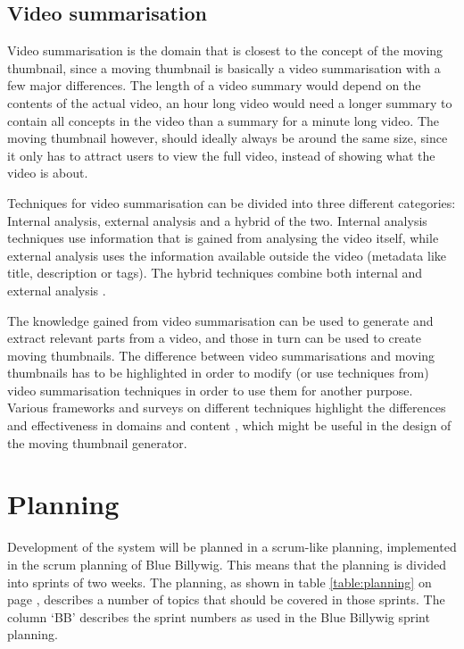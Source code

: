 \documentclass{../resources/acm_proc_article-sp}
\begin{document}
\subsection{Video summarisation}

Video summarisation is the domain that is closest to the concept of the moving thumbnail, since a moving thumbnail is basically a video summarisation with a few major differences. The length of a video summary would depend on the contents of the actual video, an hour long video would need a longer summary to contain all concepts in the video than a summary for a minute long video. The moving thumbnail however, should ideally always be around the same size, since it only has to attract users to view the full video, instead of showing what the video is about.

Techniques for video summarisation can be divided into three different categories: Internal analysis, external analysis and a hybrid of the two. Internal analysis techniques use information that is gained from analysing the video itself, while external analysis uses the information available outside the video (metadata like title, description or tags). The hybrid techniques combine both internal and external analysis \cite{Money:2008fn}.

The knowledge gained from video summarisation can be used to generate and extract relevant parts from a video, and those in turn can be used to create moving thumbnails. The difference between video summarisations and moving thumbnails has to be highlighted in order to modify (or use techniques from) video summarisation techniques in order to use them for another purpose. Various frameworks and surveys on different techniques highlight the differences and effectiveness in domains and content \cite{Money:2008fn,Ajmal:2012hi}, which might be useful in the design of the moving thumbnail generator.

\section{Planning}

Development of the system will be planned in a scrum-like planning, implemented in the scrum planning of Blue Billywig. This means that the planning is divided into sprints of two weeks. The planning, as shown in table \ref{table:planning} on page \pageref{table:planning}, describes a number of topics that should be covered in those sprints. The column `BB' describes the sprint numbers as used in the Blue Billywig sprint planning.
\end{document}
